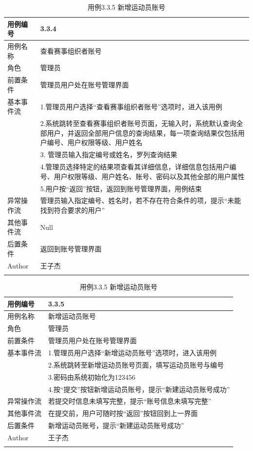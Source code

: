 \documentclass[a4paper,UTF8]{article}
\begin{document}
\begin{table}[H]
	\begin{center}
		\caption{用例3.3.4 查看赛事组织者账号}
		\label{table:Tab_uc334}
		\begin{tabular}{|p{}|p{}|}
			\hline\noalign{\smallskip}
			用例编号 & 3.3.4\\
			\hline
			用例名称 &  查看赛事组织者账号\\
			\hline
			角色 & 管理员\\
			\hline
			前置条件 & 管理员用户处在账号管理界面 \\
			\hline
			基本事件流 & 1.管理员用户选择“查看赛事组织者账号”选项时，进入该用例 \\& 2.系统跳转至查看赛事组织者账号页面，无输入时，系统默认查询全部用户，并返回全部用户信息的查询结果，每一项查询结果仅包括用户编号、用户权限等级、用户姓名 \\ & 3. 管理员输入指定编号或姓名，罗列查询结果 \\ & 4.管理员选择特定的结果项查看其详细信息，详细信息包括用户编号、用户权限等级、用户姓名、账号、密码以及其他全部的用户属性 \\ & 5.用户按“返回”按钮，返回到账号管理界面，用例结束\\
			\hline
			异常操作流 & 管理员输入指定编号、姓名时，若不存在符合条件的项，提示“未能找到符合要求的用户” \\
			\hline
			其他事件流 & Null \\
			\hline
			后置条件 & 返回到账号管理界面 \\
			\hline
			Author & 王子杰 \\
			\noalign{\smallskip}
			\hline
			\noalign{\smallskip}
		\end{tabular}
		\caption{用例3.3.5 新增运动员账号}
		\label{table:Tab_uc335}
		\begin{tabular}{|p{}|p{}|}
			\hline\noalign{\smallskip}
			用例编号 & 3.3.5\\
			\hline
			用例名称 &  新增运动员账号\\
			\hline
			角色 & 管理员\\
			\hline
			前置条件 & 管理员用户处在账号管理界面 \\
			\hline
			基本事件流 & 1.管理员用户选择“新增运动员账号”选项时，进入该用例 \\& 2.系统跳转至新增运动员账号页面，填写运动员账号与编号 \\ & 3.密码由系统初始化为123456 \\& 4.按“提交”按钮新增运动员账号，提示“新建运动员账号成功” \\
			\hline
			异常操作流 & 若提交时信息未填写完整，提示“账号信息未填写完整”\\
			\hline
			其他事件流 & 在提交前，用户可随时按“返回”按钮回到上一界面 \\
			\hline
			后置条件 & 新增运动员账号，提示“新建运动员账号成功” \\
			\hline
			Author & 王子杰 \\
			\noalign{\smallskip}
			\hline
			\noalign{\smallskip}
		\end{tabular}
	\end{center}
\end{table}
\end{document}
